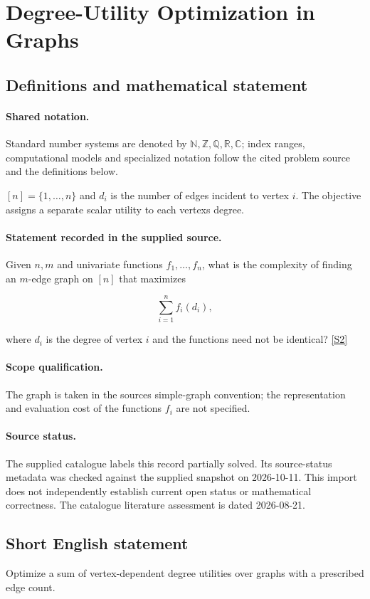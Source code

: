\documentclass[11pt]{article}
\newcommand{\sref}[2]{\hyperlink{source:#1:#2}{[S#2]}}
\begin{document}
\section{Degree-Utility Optimization in Graphs}\label{statement}

\subsection{Definitions and mathematical statement}

\paragraph{Shared notation.}Standard number systems are denoted by $\mathbb N,\mathbb Z,\mathbb Q,\mathbb R,\mathbb C$; index ranges, computational models and specialized notation follow the cited problem source and the definitions below.


$[n]=\{1,\ldots,n\}$ and $d_i$ is the number of edges incident to vertex $i$. The objective assigns a separate scalar utility to each vertex\textquotesingle s degree.
\paragraph{Statement recorded in the supplied source.}
Given $n,m$ and univariate functions $f_1,\ldots,f_n$, what is the complexity of finding an $m$-edge graph on $[n]$ that maximizes

$$\sum_{i=1}^nf_i(d_i),$$

where $d_i$ is the degree of vertex $i$ and the functions need not be identical? \sref{statement}{2}
\paragraph{Scope qualification.}
The graph is taken in the source\textquotesingle s simple-graph convention; the representation and evaluation cost of the functions $f_i$ are not specified.
\paragraph{Source status.}
The supplied catalogue labels this record partially solved. Its source-status metadata was checked against the supplied snapshot on 2026-10-11. This import does not independently establish current open status or mathematical correctness. The catalogue literature assessment is dated 2026-08-21.
\subsection{Short English statement}
Optimize a sum of vertex-dependent degree utilities over graphs with a prescribed edge count.
\end{document}

